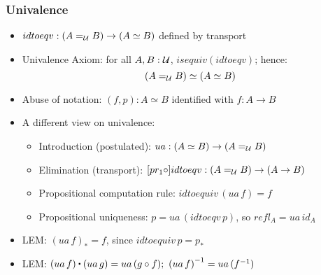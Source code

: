 \documentclass[handout]{beamer}
\newcommand{\UU}{{\cal U}}
\newcommand{\ct}{%
  \mathchoice{\mathbin{\raisebox{0.5ex}{$\displaystyle\centerdot$}}}%
             {\mathbin{\raisebox{0.5ex}{$\centerdot$}}}%
             {\mathbin{\raisebox{0.25ex}{$\scriptstyle\,\centerdot\,$}}}%
             {\mathbin{\raisebox{0.1ex}{$\scriptscriptstyle\,\centerdot\,$}}}
}
\newcommand{\opp}[1]{\mathord{{#1}^{-1}}}
\begin{document}
\frame
  {

    \frametitle{Univalence}

    \begin{itemize}[<+->]
    \item $idtoeqv: (A=_\UU B) \to (A\simeq B)$ defined by transport
    \item Univalence Axiom: for all $A,B:\UU$, $isequiv(idtoeqv)$; hence:
          $$(A=_\UU B) \simeq (A\simeq B)$$
    \item Abuse of notation: $(f,p):A\simeq B$ identified with $f:A\to B$
    \item A different view on univalence:
      \begin{itemize}
      \item Introduction (postulated): $ua:(A\simeq B) \to (A=_\UU B)$  
      \item Elimination (transport): $[pr_1\circ] idtoeqv: (A=_\UU B) \to (A\to B)$ 
      \item Propositional computation rule: $idtoequiv\,(ua\,f) = f$
      \item Propositional uniqueness: $p=ua\,(idtoeqv\,p)$, so $refl_A = ua\,id_A$
      \end{itemize}
    \item LEM: $(ua\,f)_* = f$, since $idtoequiv\,p = p_*$
    \item LEM: $(ua\,f)\ct(ua\,g) = ua\,(g\circ f);~\opp{(ua\,f)}= ua\,(\opp f)$
   \end{itemize}
  }
\end{document}
